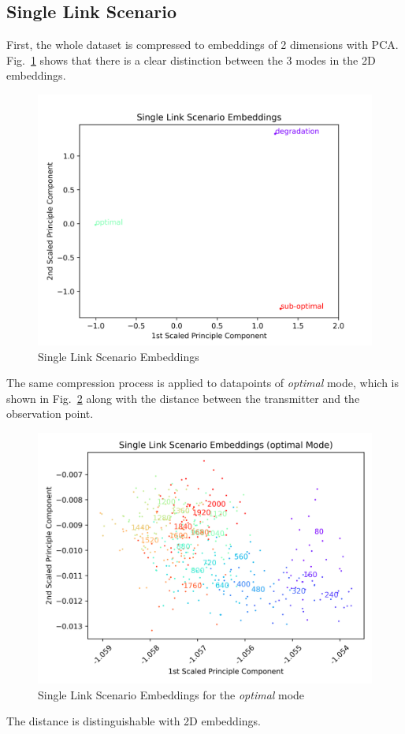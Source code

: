 \documentclass[lettersize,journal, one-column]{IEEEtran}
\begin{document}
\subsection{Single Link Scenario}
\label{section:results_single_link}
First, the whole dataset is compressed to embeddings of 2 dimensions with PCA.
Fig.~\ref{figure:single_whole} shows that there is a clear distinction between the 3 modes in the 2D embeddings.
\begin{figure}
	\centering
    \includegraphics[width=\columnwidth]{figures/single_scenario.png}
    \caption{Single Link Scenario Embeddings}
	\label{figure:single_whole}
\end{figure}
The same compression process is applied to datapoints of \textit{optimal} mode, which is shown in Fig.~\ref{figure:single_optimal} along with the distance between the transmitter and the observation point.
\begin{figure}
	\centering
    \includegraphics[width=\columnwidth]{figures/single_scenario(optimal).png}
    \caption{Single Link Scenario Embeddings for the \textit{optimal} mode}
	\label{figure:single_optimal}
\end{figure}
The distance is distinguishable with 2D embeddings.
\end{document}
